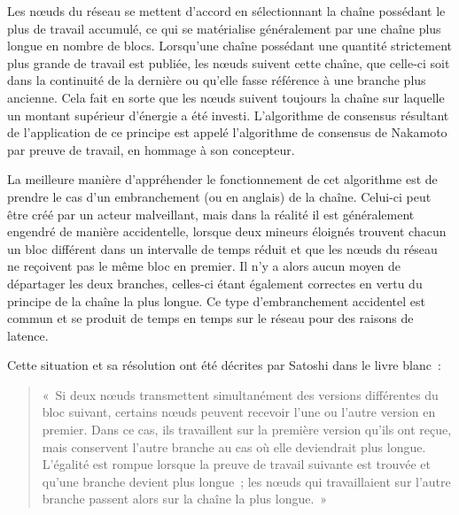 Les nœuds du réseau se mettent d'accord en sélectionnant la chaîne possédant le plus de travail accumulé, ce qui se matérialise généralement par une chaîne plus longue en nombre de blocs. Lorsqu'une chaîne possédant une quantité strictement plus grande de travail est publiée, les nœuds suivent cette chaîne, que celle-ci soit dans la continuité de la dernière ou qu'elle fasse référence à une branche plus ancienne. Cela fait en sorte que les nœuds suivent toujours la chaîne sur laquelle un montant supérieur d'énergie a été investi. L'algorithme de consensus résultant de l'application de ce principe est appelé l'algorithme de consensus de Nakamoto par preuve de travail, en hommage à son concepteur.


La meilleure manière d'appréhender le fonctionnement de cet algorithme est de prendre le cas d'un embranchement (ou  en anglais) de la chaîne. Celui-ci peut être créé par un acteur malveillant, mais dans la réalité il est généralement engendré de manière accidentelle, lorsque deux mineurs éloignés trouvent chacun un bloc différent dans un intervalle de temps réduit et que les nœuds du réseau ne reçoivent pas le même bloc en premier. Il n'y a alors aucun moyen de départager les deux branches, celles-ci étant également correctes en vertu du principe de la chaîne la plus longue. Ce type d'embranchement accidentel est commun et se produit de temps en temps sur le réseau pour des raisons de latence.

Cette situation et sa résolution ont été décrites par Satoshi dans le livre blanc~:

\begin{quote}
«~Si deux nœuds transmettent simultanément des versions différentes du bloc suivant, certains nœuds peuvent recevoir l'une ou l'autre version en premier. Dans ce cas, ils travaillent sur la première version qu'ils ont reçue, mais conservent l'autre branche au cas où elle deviendrait plus longue. L'égalité est rompue lorsque la preuve de travail suivante est trouvée et qu'une branche devient plus longue~; les nœuds qui travaillaient sur l'autre branche passent alors sur la chaîne la plus longue.~»
\end{quote}

